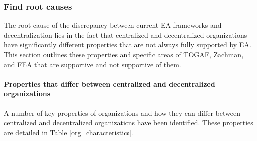 \subsubsection{Find root causes}


The root cause of the discrepancy between current EA frameworks and decentralization lies in the fact that centralized and decentralized organizations have significantly different properties that are not always fully supported by EA. This section outlines these properties and specific areas of TOGAF, Zachman, and FEA that are supportive and not supportive of them. 

\paragraph*{Properties that differ between centralized and decentralized organizations}

A number of key properties of organizations and how they can differ between centralized and decentralized organizations have been identified.  These properties are detailed in Table \ref{org_characteristics}.

